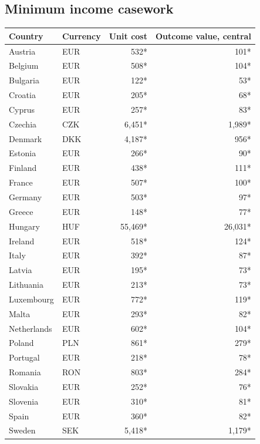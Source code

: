 \subsection*{Minimum income casework}
\begin{longtable}{llrr}
\toprule
Country & Currency & Unit cost & Outcome value, central \\
\midrule
\endhead
Austria & EUR & 532* & 101* \\
Belgium & EUR & 508* & 104* \\
Bulgaria & EUR & 122* & 53* \\
Croatia & EUR & 205* & 68* \\
Cyprus & EUR & 257* & 83* \\
Czechia & CZK & 6,451* & 1,989* \\
Denmark & DKK & 4,187* & 956* \\
Estonia & EUR & 266* & 90* \\
Finland & EUR & 438* & 111* \\
France & EUR & 507* & 100* \\
Germany & EUR & 503* & 97* \\
Greece & EUR & 148* & 77* \\
Hungary & HUF & 55,469* & 26,031* \\
Ireland & EUR & 518* & 124* \\
Italy & EUR & 392* & 87* \\
Latvia & EUR & 195* & 73* \\
Lithuania & EUR & 213* & 73* \\
Luxembourg & EUR & 772* & 119* \\
Malta & EUR & 293* & 82* \\
Netherlands & EUR & 602* & 104* \\
Poland & PLN & 861* & 279* \\
Portugal & EUR & 218* & 78* \\
Romania & RON & 803* & 284* \\
Slovakia & EUR & 252* & 76* \\
Slovenia & EUR & 310* & 81* \\
Spain & EUR & 360* & 82* \\
Sweden & SEK & 5,418* & 1,179* \\
\bottomrule
\end{longtable}

